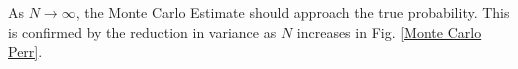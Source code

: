 \documentclass[conference]{IEEEtran}
\begin{document}
As $N\rightarrow\infty$, the Monte Carlo Estimate should approach the true probability. This is confirmed by the reduction in variance as $N$ increases in Fig. \ref{Monte Carlo Perr}.
\end{document}

